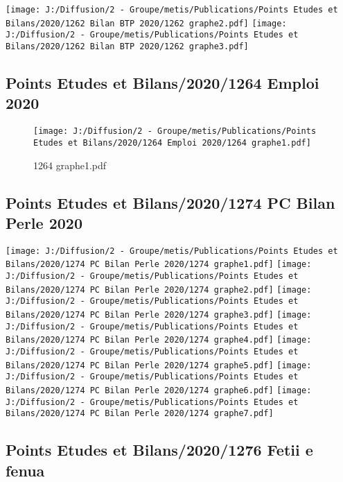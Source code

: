 \documentclass[
]{article}
\begin{document}
\texttt{[image: J:/Diffusion/2 - Groupe/metis/Publications/Points Etudes et Bilans/2020/1262 Bilan BTP 2020/1262 graphe2.pdf]}
\texttt{[image: J:/Diffusion/2 - Groupe/metis/Publications/Points Etudes et Bilans/2020/1262 Bilan BTP 2020/1262 graphe3.pdf]}

\hypertarget{points-etudes-et-bilans20201264-emploi-2020}{%
\subsection{Points Etudes et Bilans/2020/1264 Emploi
2020}\label{points-etudes-et-bilans20201264-emploi-2020}}

\begin{figure}
\centering
\texttt{[image: J:/Diffusion/2 - Groupe/metis/Publications/Points Etudes et Bilans/2020/1264 Emploi 2020/1264 graphe1.pdf]}
\caption{1264 graphe1.pdf}
\end{figure}

\hypertarget{points-etudes-et-bilans20201274-pc-bilan-perle-2020}{%
\subsection{Points Etudes et Bilans/2020/1274 PC Bilan Perle
2020}\label{points-etudes-et-bilans20201274-pc-bilan-perle-2020}}

\texttt{[image: J:/Diffusion/2 - Groupe/metis/Publications/Points Etudes et Bilans/2020/1274 PC Bilan Perle 2020/1274 graphe1.pdf]}
\texttt{[image: J:/Diffusion/2 - Groupe/metis/Publications/Points Etudes et Bilans/2020/1274 PC Bilan Perle 2020/1274 graphe2.pdf]}
\texttt{[image: J:/Diffusion/2 - Groupe/metis/Publications/Points Etudes et Bilans/2020/1274 PC Bilan Perle 2020/1274 graphe3.pdf]}
\texttt{[image: J:/Diffusion/2 - Groupe/metis/Publications/Points Etudes et Bilans/2020/1274 PC Bilan Perle 2020/1274 graphe4.pdf]}
\texttt{[image: J:/Diffusion/2 - Groupe/metis/Publications/Points Etudes et Bilans/2020/1274 PC Bilan Perle 2020/1274 graphe5.pdf]}
\texttt{[image: J:/Diffusion/2 - Groupe/metis/Publications/Points Etudes et Bilans/2020/1274 PC Bilan Perle 2020/1274 graphe6.pdf]}
\texttt{[image: J:/Diffusion/2 - Groupe/metis/Publications/Points Etudes et Bilans/2020/1274 PC Bilan Perle 2020/1274 graphe7.pdf]}

\hypertarget{points-etudes-et-bilans20201276-fetii-e-fenua}{%
\subsection{Points Etudes et Bilans/2020/1276 Fetii e
fenua}\label{points-etudes-et-bilans20201276-fetii-e-fenua}}
\end{document}
